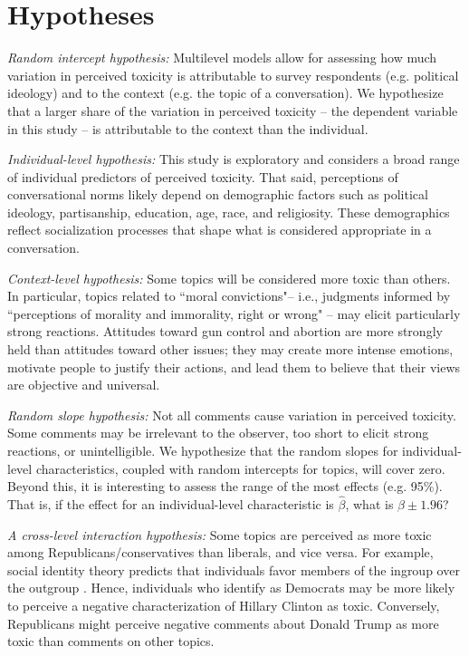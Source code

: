 \documentclass{article}
\begin{document}
\section{Hypotheses}

\textit{Random intercept hypothesis:} Multilevel models allow for assessing how much variation in perceived toxicity is attributable to survey respondents (e.g. political ideology) and to the context (e.g. the topic of a conversation). We hypothesize that a larger share of the variation in perceived toxicity -- the dependent variable in this study -- is attributable to the context than the individual.

\textit{Individual-level hypothesis:} This study is exploratory and considers a broad range of individual predictors of perceived toxicity. That said, perceptions of conversational norms likely depend on demographic factors such as political ideology, partisanship, education, age, race, and religiosity. These demographics reflect socialization processes that shape what is considered appropriate in a conversation. 

\textit{Context-level hypothesis:} Some topics will be considered more toxic than others. In particular, topics related to ``moral convictions"-- i.e., judgments informed by ``perceptions of morality and immorality, right or wrong" \citep{skitka_conviction_2010} -- may elicit particularly strong reactions. Attitudes toward gun control and abortion are more strongly held than attitudes toward other issues; they may create more intense emotions, motivate people to justify their actions, and lead them to believe that their views are objective and universal. 

\textit{Random slope hypothesis:} Not all comments cause variation in perceived toxicity. Some comments may be irrelevant to the observer, too short to elicit strong reactions, or unintelligible. We hypothesize that the random slopes for individual-level characteristics, coupled with random intercepts for topics, will cover zero. Beyond this, it is interesting to assess the range of the most effects (e.g. 95\%). That is, if the effect for an individual-level characteristic is $\hat \beta$, what is $\beta\pm 1.96$?

\textit{A cross-level interaction hypothesis:} Some topics are perceived as more toxic among Republicans/conservatives than liberals, and vice versa. For example, social identity theory predicts that individuals favor members of the ingroup over the outgroup \citep{tafjelturner_identity_2004}. Hence, individuals who identify as Democrats may be more likely to perceive a negative characterization of Hillary Clinton as toxic. Conversely, Republicans might perceive negative comments about Donald Trump as more toxic than comments on other topics.
\end{document}
